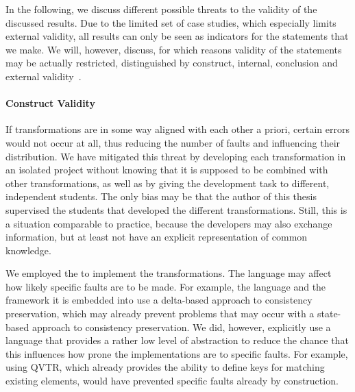 In the following, we discuss different possible threats to the validity of the discussed results.
Due to the limited set of case studies, which especially limits external validity, all results can only be seen as indicators for the statements that we make.
We will, however, discuss, for which reasons validity of the statements may be actually restricted, distinguished by construct, internal, conclusion and external validity~\cite{wohlin2012validity-Book}. %

\paragraph{Construct Validity}
If transformations are in some way aligned with each other a priori, certain errors would not occur at all, thus reducing the number of faults and influencing their distribution.
We have %
mitigated this threat by developing each transformation in an isolated project without knowing that it is supposed to be combined with other transformations, as well as by giving the development task to different, independent students.
The only bias may be that the author of this thesis supervised the students that developed the different transformations.
Still, this is a situation comparable to practice, because the developers may also exchange information, but at least not have an explicit representation of common knowledge.

We employed the \reactionslanguage to implement the transformations.
The language may affect how likely specific faults are to be made.
For example, the language and the \vitruv framework it is embedded into use a delta-based approach to consistency preservation, which may already prevent problems that may occur with a state-based approach to consistency preservation.
We did, however, explicitly use a language that provides a rather low level of abstraction to reduce the chance that this influences how prone the implementations are to specific faults.
For example, using \gls{QVTR}, which already provides the ability to define keys for matching existing elements, would have prevented specific faults already by construction.

